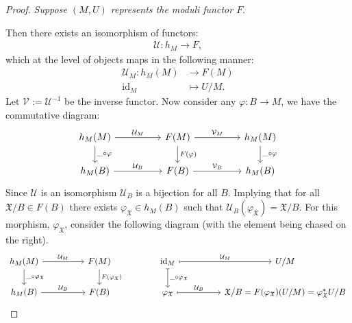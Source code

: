 \begin{proof}
    \textit{Suppose $(M,U)$ represents the moduli functor $F$}.
    \par Then there exists an isomorphism of functors:
    \begin{align*}
        \mathcal{U}:h_{M} \to F,
    \end{align*}
    which at the level of objects maps in the following manner:
    \begin{align*}
        \mathcal{U}_{M}:h_{M}(M) &\to F(M)\\
        \text{id}_{M} &\mapsto U/M.
    \end{align*}
    Let $\mathcal{V}:= \mathcal{U}^{-1}$ be the inverse functor. Now consider any $\varphi: B \to M$, we have the commutative diagram:
    \[
        \begin{tikzcd}
            h_{M}(M) & & F(M) & & h_{M}(M)\\
            h_{M}(B) & & F(B) & & h_{M}(B)
            \arrow["\mathcal{U}_{M}", from = 1-1, to = 1-3]
            \arrow["\mathcal{V}_{M}", from = 1-3, to = 1-5]
            \arrow["\mathcal{U}_{B}", from = 2-1, to = 2-3]
            \arrow["\mathcal{V}_B", from = 2-3, to = 2-5]
            \arrow["F(\varphi)", from = 1-3, to = 2-3]
            \arrow["\_\circ \varphi", from = 1-1, to = 2-1]
            \arrow["\_\circ \varphi", from = 1-5, to = 2-5]
        \end{tikzcd}
    \]
    Since $\mathcal{U}$ is an isomorphism $\mathcal{U}_{B}$ is a bijection for all $B$. Implying that for all $\mathfrak{X}/B \in F(B)$ there exists $\varphi_{\mathfrak{X}}\in h_{M}(B)$ such that $\mathcal{U}_{B}(\varphi_{\mathfrak{X}}) = \mathfrak{X}/B$. 
    For this morphism, $\varphi_{\mathfrak{X}}$, consider the following diagram (with the element being chased on the right).
    \[
        \begin{tikzcd}
            h_{M}(M) & & F(M) & & \text{id}_{M} && U/M\\
            h_{M}(B) & & F(B) & & \varphi_{\mathfrak{X}} && \mathfrak{X}/B = F(\varphi_{\mathfrak{X}})(U/M) = \varphi_{\mathfrak{X}}^{*}U/B
            \arrow["\mathcal{U}_{M}", from = 1-1, to = 1-3]
            \arrow["\mathcal{U}_{B}", from = 2-1, to = 2-3]
            \arrow["F(\varphi_{\mathfrak{X}})", from = 1-3, to = 2-3]
            \arrow["\_\circ \varphi_{\mathfrak{X}}", from = 1-1, to = 2-1]
            \arrow["\mathcal{U}_{M}", mapsto, from = 1-5, to = 1-7]
            \arrow["\mathcal{U}_{B}", mapsto, from = 2-5, to = 2-7]
            \arrow["\_\circ \varphi_{\mathfrak{X}}", mapsto, from = 1-5, to = 2-5]

\end{tikzcd}\]
\end{proof}
